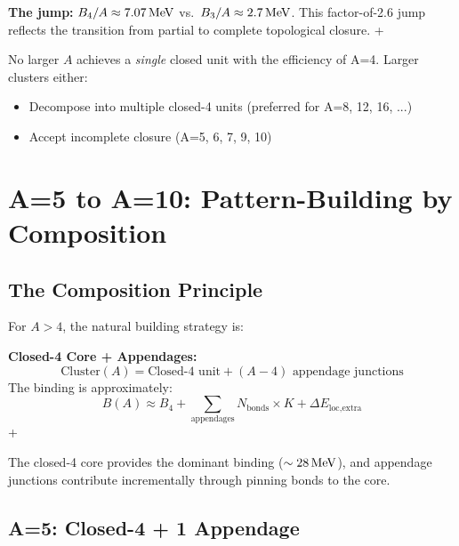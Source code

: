 \begin{resultbox}
    \textbf{The jump:} $B_4/A \approx 7.07\,\mathrm{MeV}$ vs.\ $B_3/A \approx 2.7\,\mathrm{MeV}$.
    This factor-of-2.6 jump reflects the transition from partial to complete
    topological closure.
    \tagDc + \tagP
\end{resultbox}

No larger $A$ achieves a \emph{single} closed unit with the efficiency of
A=4. Larger clusters either:
\begin{itemize}
    \item Decompose into multiple closed-4 units (preferred for A=8, 12, 16, ...)
    \item Accept incomplete closure (A=5, 6, 7, 9, 10)
\end{itemize}

\tagP

\section{A=5 to A=10: Pattern-Building by Composition}
\label{sec:light:composition}

\subsection{The Composition Principle}

For $A > 4$, the natural building strategy is:

\begin{derivationbox}
    \textbf{Closed-4 Core + Appendages:}
    \begin{equation}
        \text{Cluster}(A) = \text{Closed-4 unit} + (A - 4) \text{ appendage junctions}
        \label{eq:composition}
    \end{equation}
    The binding is approximately:
    \begin{equation}
        B(A) \approx B_4 + \sum_{\text{appendages}} N_{\text{bonds}} \times K
        + \Delta E_{\text{loc,extra}}
        \label{eq:composition_be}
    \end{equation}
    \tagP + \tagI
\end{derivationbox}

The closed-4 core provides the dominant binding ($\sim 28\,\mathrm{MeV}$), and appendage
junctions contribute incrementally through pinning bonds to the core.

\subsection{A=5: Closed-4 + 1 Appendage}

